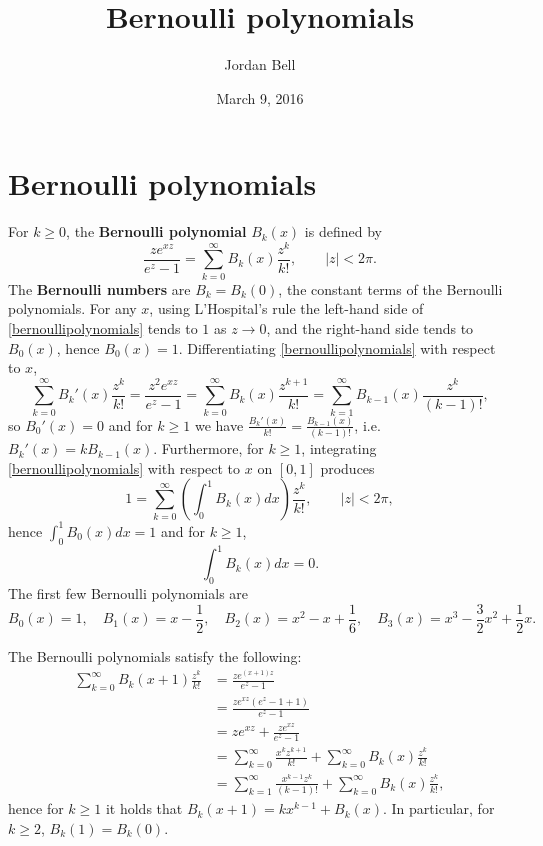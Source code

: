 \documentclass{article}
\theoremstyle{definition}
\begin{document}
\title{Bernoulli polynomials}
\author{Jordan Bell}
\date{March 9, 2016}

\maketitle

\section{Bernoulli polynomials}
For $k \geq 0$, the \textbf{Bernoulli polynomial} $B_k(x)$ is defined by
\begin{equation}
\frac{ze^{xz}}{e^z-1} = \sum_{k=0}^\infty B_k(x) \frac{z^k}{k!},\qquad |z|<2\pi.
\label{bernoullipolynomials}
\end{equation}
The \textbf{Bernoulli numbers} are $B_k = B_k(0)$, the constant terms of the Bernoulli polynomials.
For any $x$, using L'Hospital's rule the left-hand side of \eqref{bernoullipolynomials} tends to $1$ as $z \to 0$, and the right-hand side
tends to $B_0(x)$, hence $B_0(x)=1$. 
Differentiating \eqref{bernoullipolynomials} with respect to $x$,
\[
\sum_{k=0}^\infty B_k'(x) \frac{z^k}{k!} = \frac{z^2 e^{xz}}{e^z-1} = \sum_{k=0}^\infty B_k(x) \frac{z^{k+1}}{k!}
=\sum_{k=1}^\infty B_{k-1}(x) \frac{z^k}{(k-1)!},
\]
so $B_0'(x) = 0$ and for $k \geq 1$ we have $\frac{B_k'(x)}{k!} = \frac{B_{k-1}(x)}{(k-1)!}$, i.e.
$B_k'(x)=k B_{k-1}(x)$. Furthermore, for $k \geq 1$, integrating \eqref{bernoullipolynomials} with respect
to $x$ on $[0,1]$ produces
\[
1 = \sum_{k=0}^\infty \left( \int_0^1 B_k(x) dx \right) \frac{z^k}{k!},\qquad |z|<2\pi,
\]
hence $\int_0^1 B_0(x) dx =1$ and for $k \geq 1$,
\[
\int_0^1 B_k(x) dx = 0.
\] 
The first few Bernoulli polynomials are
\[
B_0(x)=1,\quad B_1(x) = x-\frac{1}{2},\quad B_2(x) = x^2-x+\frac{1}{6},
\quad B_3(x)=x^3-\frac{3}{2}x^2+\frac{1}{2}x.
\]


The Bernoulli polynomials  satisfy the following:
\begin{align*}
\sum_{k=0}^\infty B_k(x+1) \frac{z^k}{k!}&=\frac{ze^{(x+1)z}}{e^z-1}\\
&=\frac{ze^{xz} (e^z-1+1)}{e^z-1}\\
&=ze^{xz}+\frac{ze^{xz}}{e^z-1}\\
&=\sum_{k=0}^\infty \frac{x^k z^{k+1}}{k!} + \sum_{k=0}^\infty B_k(x) \frac{z^k}{k!}\\
&=\sum_{k=1}^\infty \frac{x^{k-1} z^k}{(k-1)!} +  \sum_{k=0}^\infty B_k(x) \frac{z^k}{k!},
\end{align*}
hence for $k \geq 1$ it holds that $B_k(x+1) = kx^{k-1} + B_k(x)$. In particular, for $k \geq 2$,
$B_k(1)=B_k(0)$.
\end{document}
